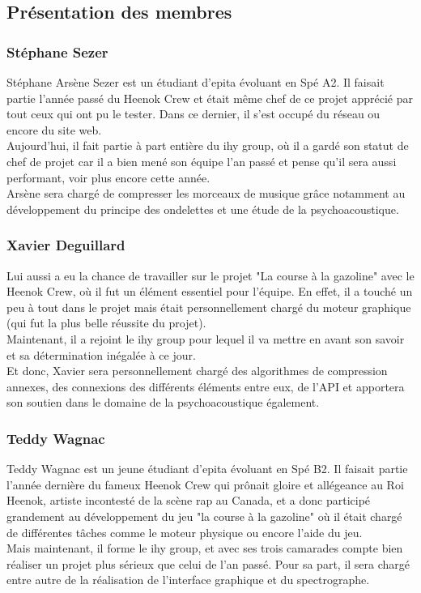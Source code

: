 	\subsection{Présentation des membres}

		\subsubsection{Stéphane Sezer}
Stéphane Arsène  Sezer est un  étudiant d'epita évoluant  en Spé A2.  Il
faisait partie  l'année passé du  Heenok Crew et  était même chef  de ce
projet apprécié par tout ceux qui ont pu le tester.  Dans ce dernier, il
s'est occupé du réseau ou encore du site web.\\
Aujourd'hui,  il fait partie à part entière du ihy group,  où il a gardé
son statut de chef de projet car il a bien mené son équipe l'an passé et
pense qu'il sera aussi performant, voir plus encore cette année.\\
Arsène sera chargé de compresser les morceaux de musique grâce notamment
au  développement  du  principe  des  ondelettes  et  une  étude  de  la
psychoacoustique.

		\subsubsection{Xavier Deguillard}
Lui aussi  a eu la  chance de travailler sur  le projet "La  course à la
gazoline"  avec le  Heenok Crew,  où  il fut  un élément  essentiel pour
l'équipe.  En effet, il a touché un peu à tout dans le projet mais était
personnellement  chargé  du moteur  graphique  (qui  fut  la  plus belle
réussite du projet).\\
Maintenant,  il a rejoint le ihy group pour lequel il va mettre en avant
son savoir et sa détermination inégalée à ce jour.\\
Et  donc,   Xavier  sera  personnellement   chargé  des  algorithmes  de
compression annexes,  des connexions des  différents éléments entre eux,
de l'API et apportera son soutien dans le domaine de la psychoacoustique
également.

		\subsubsection{Teddy Wagnac}
Teddy Wagnac est  un  jeune  étudiant  d'epita  évoluant  en Spé B2.  Il
faisait partie l'année dernière du fameux Heenok Crew qui prônait gloire
et  allégeance au  Roi Heenok,  artiste  incontesté de  la scène  rap au
Canada,  et a donc  participé  grandement  au  développement  du jeu "la
course à la gazoline" où il  était chargé de différentes tâches comme le
moteur physique ou encore l'aide du jeu.\\
Mais maintenant,  il  forme le ihy  group,  et avec ses  trois camarades
compte bien  réaliser un projet plus  sérieux que  celui de  l'an passé.
Pour  sa  part,  il  sera  chargé  entre  autre  de  la  réalisation  de
l'interface graphique et du spectrographe.


